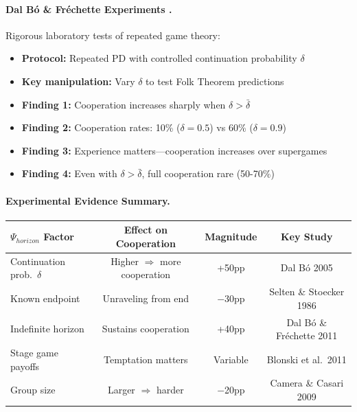 \paragraph{Dal B\'{o} \& Fr\'{e}chette Experiments \citep{dalbo2011,dalbofrechette2018}.}
Rigorous laboratory tests of repeated game theory:
\begin{itemize}[nosep]
    \item \textbf{Protocol:} Repeated PD with controlled continuation probability $\delta$
    \item \textbf{Key manipulation:} Vary $\delta$ to test Folk Theorem predictions
    \item \textbf{Finding 1:} Cooperation increases sharply when $\delta > \bar{\delta}$
    \item \textbf{Finding 2:} Cooperation rates: 10\% ($\delta = 0.5$) vs 60\% ($\delta = 0.9$)
    \item \textbf{Finding 3:} Experience matters---cooperation increases over supergames
    \item \textbf{Finding 4:} Even with $\delta > \bar{\delta}$, full cooperation rare (50-70\%)
\end{itemize}

\paragraph{Experimental Evidence Summary.}
\begin{center}
\small
\begin{tabular}{@{}lccc@{}}
\toprule
\textbf{$\Psi_{horizon}$ Factor} & \textbf{Effect on Cooperation} & \textbf{Magnitude} & \textbf{Key Study} \\
\midrule
Continuation prob.\ $\delta$ & Higher $\Rightarrow$ more cooperation & +50pp & Dal B\'{o} 2005 \\
Known endpoint & Unraveling from end & $-$30pp & Selten \& Stoecker 1986 \\
Indefinite horizon & Sustains cooperation & +40pp & Dal B\'{o} \& Fr\'{e}chette 2011 \\
Stage game payoffs & Temptation matters & Variable & Blonski et al.\ 2011 \\
Group size & Larger $\Rightarrow$ harder & $-$20pp & Camera \& Casari 2009 \\
\bottomrule
\end{tabular}
\end{center}

